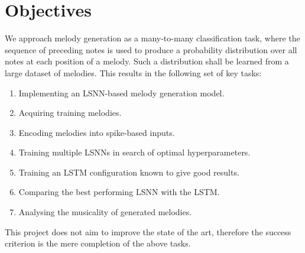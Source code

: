 \documentclass[../../report.tex]{subfiles}
\begin{document}
\section{Objectives}

We approach melody generation as a many-to-many classification task, where the
sequence of preceding notes is used to produce a probability distribution over
all notes at each position of a melody. Such a distribution shall be learned
from a large dataset of melodies. This results in the following set of key
tasks:

\begin{enumerate}
  \item Implementing an LSNN-based melody generation model.
  \item Acquiring training melodies.
  \item Encoding melodies into spike-based inputs.
  \item Training multiple LSNNs in search of optimal hyperparameters.
  \item Training an LSTM configuration known to give good results.
  \item Comparing the best performing LSNN with the LSTM.
  \item Analysing the musicality of generated melodies.
\end{enumerate}

This project does not aim to improve the state of the art, therefore the success
criterion is the mere completion of the above tasks.
\end{document}
